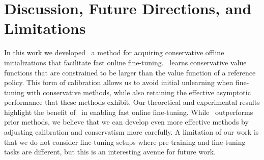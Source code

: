 \section{Discussion, Future Directions, and  Limitations}

In this work we developed \methodname\, a method for acquiring conservative offline initializations that facilitate fast online fine-tuning. \methodname\ learns conservative value functions that are constrained to be larger than the value function of a reference policy. This form of calibration allows us to avoid initial unlearning when fine-tuning with conservative methods, while also retaining the effective asymptotic performance that these methods exhibit. Our theoretical and experimental results highlight the benefit of \methodname\ in enabling fast online fine-tuning. 
While \methodname\ outperforms prior methods, we believe that we can develop even more effective methods by adjusting calibration and conservatism more carefully. A limitation of our work is that we do not consider fine-tuning setups where pre-training and fine-tuning tasks are different, but this is an interesting avenue for future work.   